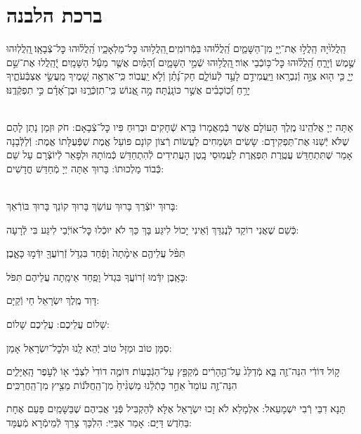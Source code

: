 \documentclass[twoside, openany, parskip=half, 11pt]{book}
\begin{document}
\section[ברכת הלבנה]{ ברכת הלבנה }

הַֽלֲלוּ֙יָהּ הַֽלֲל֣וּ אֶת־יְ֖יָ מִן־הַשָּׁמַ֑יִם הַֽ֝לֲל֗וּהוּ בַּמְּֿרוֹמִֽים׃
֭הַֽלֲל֥וּהוּ כׇּל־מַלְאָכָ֑יו הַֽ֝לֲל֗וּהוּ כׇּל־צְֿבָאָֽו׃
֖הַֽלֲלֽוּהוּ שֶׁ֣מֶשׁ וְֿיָרֵ֑חַ הַֽ֝לֲל֗וּהוּ כׇּל־כּ֥וֹכְֿבֵי אֽוֹר׃
֖הַֽלֲל֥וּהוּ שְֿׁמֵ֣י הַשָּׁמָ֑יִם וְֿ֝הַמַּ֗יִם אֲשֶׁ֤ר מֵעַ֬ל הַשָּׁמָֽיִם׃
יְֿ֭הַֽלֲלוּ אֶת־שֵׁ֣ם יְיָ֑ כִּ֤י ה֖וּא צִוָּ֣ה וְֿנִבְרָֽאוּ׃
וַיַּֽעֲמִידֵ֣ם לָעַ֣ד לְֿעוֹלָ֑ם חָק־נָ֝תַ֗ן וְֿלֹ֣א יַֽעֲבֽוֹר׃
כִּֽי־אֶרְאֶ֣ה שָׁ֭מֶיךָ מַֽעֲשֵׂ֣י אֶצְבְּֿעֹתֶ֑יךָ יָרֵ֥חַ וְֿ֝כֽוֹכָבִ֗ים אֲשֶׁ֣ר כּוֹנָֽנְֿתָּה׃
מָ֣ה אֱ֭נוֹשׁ כִּֽי־תִזְכְּֿרֶ֑נּוּ וּבֶן־אָ֝דָ֗ם כִּ֣י תִפְקְֿדֶֽנּוּ׃

\\
אַתָּה יְיָ אֱלֹהֵֽינוּ מֶֽלֶךְ הָעוֹלָם אֲשֶׁר בְּֿמַאֲמָרוֹ בָּרָא שְֿׁחָקִים וּבְרֽוּחַ פִּיו כׇּל־צְֿבָאָם: חֹק וּזְמַן נָתַן לָהֶם שֶׁלֹּא יְֿשַׁנּוּ אֶת־תַּפְקִידָם: שָׂשִׂים וּשְׂמֵחִים לַעֲשׂוֹת רְֿצוֹן קוֹנָם פּוֹעֵל אֱמֶת שֶׁפְּֿעֻלָּתוֹ אֱמֶת: וְֿלַלְּֿבָנָה אָמַר שֶׁתִּתְחַדֵּשׁ עֲטֶֽרֶת תִּפְאֶֽרֶת לַעֲמֽוּסֵי בָֽטֶן הָעֲתִידִים לְֿהִתְחַדֵּשׁ כְּֿמוֹתָהּ וּלְפָאֵר לְֿיוֹצְֿרָם עַל שֵׁם כְּֿבוֹד מַלְכוּתוֹ: בָּרוּךְ אַתָּה יְיָ מְֿחַדֵּשׁ חֳדָשִׁים:

\\
בָּרוּךְ יוֹצְֿרֵךְ בָּרוּךְ עוֹשֵׂךְ בָּרוּךְ קוֹנֵךְ בָּרוּךְ בּוֹרְֿאֵךְ:

כְּֿשֵׁם שֶׁאֲנִי רוֹקֵד לְֿנֶגְדֵּךְ וְֿאֵינִי יָכוֹל לִיגַּע בָּךְ
כַּךְ לֹא יוּכְֿלוּ כׇּל־אוֹיְֿבַי לִיגַּע בִּי לְֿרָעָה:

תִּפֹּ֨ל עֲלֵיהֶ֤ם אֵימָ֨תָה֙ וָפַ֔חַד בִּגְדֹ֥ל זְֿרֽוֹעֲךָ֖ יִדְּֿמ֣וּ כָּאָ֑בֶן׃


כָּאָֽבֶן יִדְּֿמוּ זְֿרוֹעֲךָ בִּגְדֹל וָפַֽחַד אֵימָֽתָה עֲלֵיהֶם תִּפֹּל:


דָּוִד מֶֽלֶךְ יִשְׂרָאֵל חַי וְֿקַיָּם:

שָׁלוֹם עֲלֵיכֶם: \qquad {}
עֲלֵיכֶם שָׁלוֹם:


סִמָּן טוֹב וּמַזָּל טוֹב יְֿהֵא לָֽנוּ וּלְכׇל־יִשְׂרָאֵל אָמֵן:

ק֣וֹל דּוֹדִ֔י הִנֵּה־זֶ֖ה בָּ֑א מְֿדַלֵּג֙ עַל־הֶ֣הָרִ֔ים מְֿקַפֵּ֖ץ עַל־הַגְּֿבָעֽוֹת׃ דּוֹמֶ֤ה דוֹדִי֙ לִצְבִ֔י א֖וֹ לְֿעֹ֣פֶר הָֽאַיָּלִ֑ים הִנֵּה־זֶ֤ה עוֹמֵד֙ אַחַ֣ר כָּתְֿלֵ֔נוּ מַשְׁגִּ֨יחַ֙ מִן־הַֽחֲלֹּנ֔וֹת מֵצִ֖יץ מִן־הַֽחֲרַכִּֽים׃

תָּנָא דִבֵּי רְֿבִי יִשְׁמָעֵאל: אִלְמָלֵא לֹא זָכוּ יִשְׂרָאֵל אֶלָּא לְֿהַקְבִּיל פְּֿנֵי אֲבִיהֶם שֶׁבַּשָּׁמַֽיִם פַּעַם אֶחָת בַּחֹֽדֶשׁ דַּיָּם: אָמַר אַבַּיֵּי: הִלְכָּךְ צָרֵךְ לְֿמֵימְֿרָא מְֿעֻמָּד:
\end{document}
